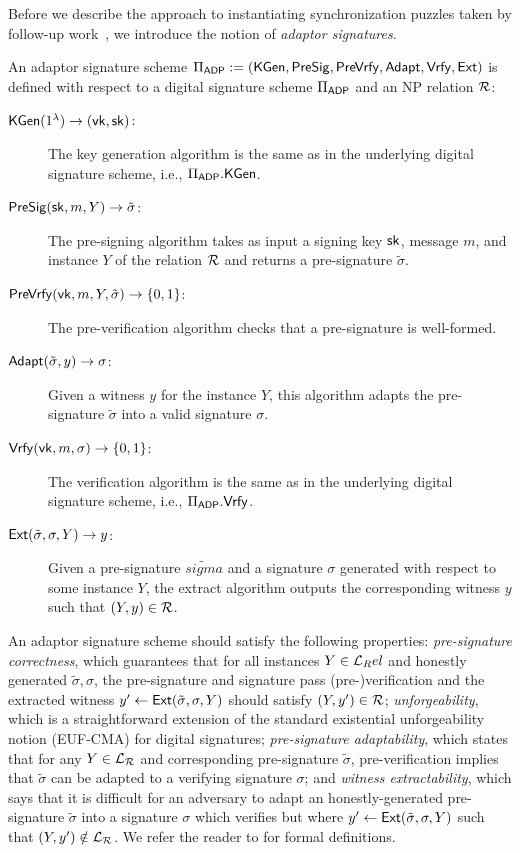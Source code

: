Before we describe the approach to instantiating synchronization puzzles taken by follow-up work~\cite{SP:TaiMorMaf21}, we introduce the notion of \emph{adaptor signatures}.

\begin{definition}
    An adaptor signature scheme $\Pi_{\mathsf{ADP}} := (\mathsf{KGen}, \mathsf{PreSig}, \mathsf{PreVrfy}, \mathsf{Adapt}, \mathsf{Vrfy}, \mathsf{Ext})$ is defined with respect to a digital signature scheme $\Pi_{\mathsf{ADP}}$ and an NP relation $\mathcal{R}$:
    \begin{description}
        \item[$\mathsf{KGen}(1^{\lambda}) \to (\mathsf{vk}, \mathsf{sk})$:] The key generation algorithm is the same as in the underlying digital signature scheme, i.e., $\Pi_{\mathsf{ADP}}.\mathsf{KGen}$.
        \item[$\mathsf{PreSig}(\mathsf{sk}, m, Y) \to \tilde{\sigma}$:] The pre-signing algorithm takes as input a signing key $\mathsf{sk}$, message $m$, and instance $Y$ of the relation $\mathcal{R}$ and returns a pre-signature $\tilde{\sigma}$.
        \item[$\mathsf{PreVrfy}(\mathsf{vk}, m, Y, \tilde{\sigma}) \to \{0, 1\}$:] The pre-verification algorithm checks that a pre-signature is well-formed.
        \item[$\mathsf{Adapt}(\tilde{\sigma}, y) \to \sigma$:] Given a witness $y$ for the instance $Y$, this algorithm adapts the pre-signature $\tilde{\sigma}$ into a valid signature $\sigma$.
        \item[$\mathsf{Vrfy}(\mathsf{vk}, m, \sigma) \to \{0, 1\}$:] The verification algorithm is the same as in the underlying digital signature scheme, i.e., $\Pi_{\mathsf{ADP}}.\mathsf{Vrfy}$.
        \item[$\mathsf{Ext}(\tilde{\sigma}, \sigma, Y) \to y$:] Given a pre-signature $\tilde{sigma}$ and a signature $\sigma$ generated with respect to some instance $Y$, the extract algorithm outputs the corresponding witness $y$ such that $(Y, y) \in \mathcal{R}$.
    \end{description}
\end{definition}

An adaptor signature scheme should satisfy the following properties: \emph{pre-signature correctness}, which guarantees that for all instances $Y \in \mathcal{L}_Rel$ and honestly generated $\tilde{\sigma}, \sigma$, the pre-signature and signature pass (pre-)verification and the extracted witness $y' \gets \mathsf{Ext}(\tilde{\sigma}, \sigma, Y)$ should satisfy $(Y, y') \in \mathcal{R}$; \emph{unforgeability}, which is a straightforward extension of the standard existential unforgeability notion (EUF-CMA) for digital signatures; \emph{pre-signature adaptability}, which states that for any $Y \in \mathcal{L}_{\mathcal{R}}$ and corresponding pre-signature $\tilde{\sigma}$, pre-verification implies that $\tilde{\sigma}$ can be adapted to a verifying signature $\sigma$; and \emph{witness extractability}, which says that it is difficult for an adversary to adapt an honestly-generated pre-signature $\tilde{\sigma}$ into a signature $\sigma$ which verifies but where $y' \gets \mathsf{Ext}(\tilde{\sigma}, \sigma, Y)$ such that $(Y, y') \notin \mathcal{L}_{\mathcal{R}}$. We refer the reader to \cite{CCS:GMMMTT22} for formal definitions.

